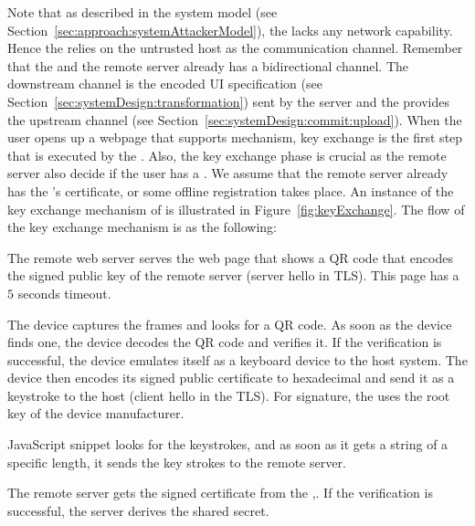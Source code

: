 Note that as described in the system model (see Section~\ref{sec:approach:systemAttackerModel}), the \device lacks any network capability. Hence the \device relies on the untrusted host as the communication channel. Remember that the \device and the remote server already has a bidirectional channel. The downstream channel is the encoded UI specification (see Section~\ref{sec:systemDesign:transformation}) sent by the server and the \name \js provides the upstream channel (see Section~\ref{sec:systemDesign:commit:upload}). 
When the user opens up a webpage that supports \name mechanism, key exchange is the first step that is executed by the \device. Also, the key exchange phase is crucial as the remote server also decide if the user has a \device. We assume that the remote server already has the \device's certificate, or some offline registration takes place. An instance of the key exchange mechanism of \name is illustrated in Figure~\ref{fig:keyExchange}. The flow of the key exchange mechanism is as the following:

\begin{mylist}
  \item[\one] The remote web server serves the web page that shows a QR code that encodes the signed public key of the remote server (server hello in TLS). This page has a $5$ seconds timeout.
  \item[\two] The device captures the frames and looks for a QR code. As soon as the device finds one, the device decodes the QR code and verifies it. If the verification is successful, the device emulates itself as a keyboard device to the host system. The device then encodes its signed public certificate to hexadecimal and send it as a keystroke to the host (client hello in the TLS). For signature, the \device uses the root key of the device manufacturer.
  \item[\three] \name  JavaScript snippet looks for the keystrokes, and as soon as it gets a string of a specific length, it sends the key strokes to the remote server.
  \item[\four] The remote server gets the signed certificate from the \device,. If the verification is successful, the server derives the shared secret.
 
\end{mylist}

